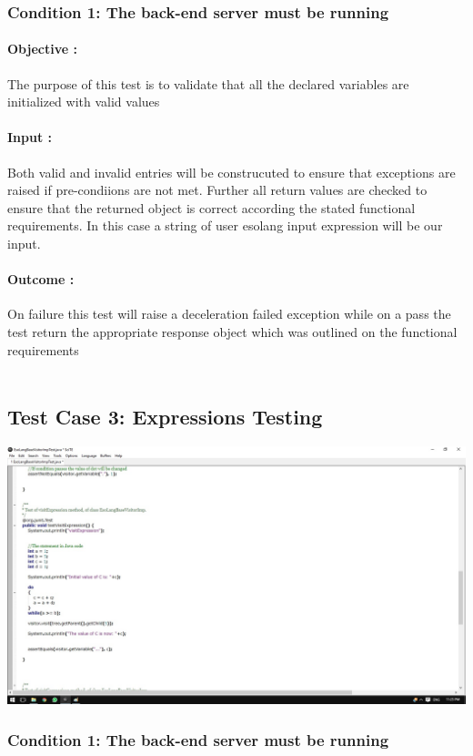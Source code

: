 \documentclass[english]{article}
\begin{document}
			\subsubsection{Condition 1: The back-end server must be running }
			\paragraph{Objective :} 
			The purpose of this test is to validate that all the declared variables are initialized with valid values
			\paragraph{Input :}
			Both valid and invalid entries will be construcuted to ensure that exceptions are raised if pre-condiions are not met. Further all return values are checked to ensure that the returned object is correct according the stated
			functional requirements. In this case a string of user  esolang input expression will be our input.
			\paragraph{Outcome :} On failure this test will raise a deceleration failed exception while on a pass the test return the  appropriate response object  which was outlined on the functional requirements  \\
			\\[12pt]	
			
			\subsection{Test Case 3: Expressions Testing} 
						\includegraphics[width=\linewidth]{test3.jpg}

			\subsubsection{Condition 1: The back-end server must be running}
\end{document}

